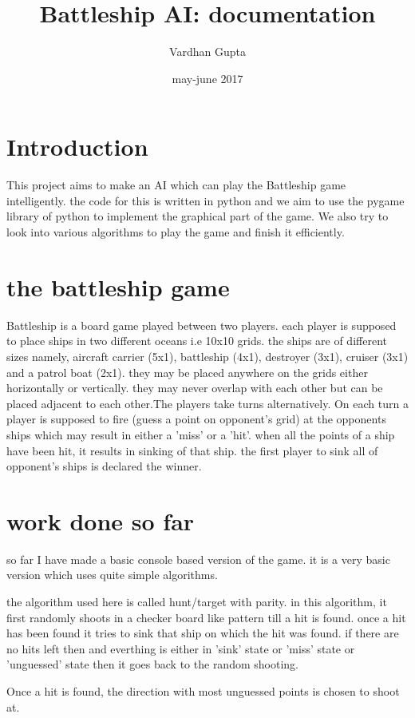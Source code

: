 \documentclass{article}
\title{Battleship AI: documentation}
\author{Vardhan Gupta}
\date{may-june 2017}
\begin{document}
   \maketitle
   \tableofcontents
   \section{Introduction}
   This project aims to make an AI which can play the Battleship game intelligently. the code for this is written in python and we aim to use the pygame library of python to implement the graphical part of the game. We also try to look into various algorithms to play the game and finish it efficiently.
   
   \section{the battleship game}
   Battleship is a board game played between two players. each player is supposed to place ships in two different oceans i.e 10x10 grids. the ships are of different sizes namely, aircraft carrier (5x1), battleship (4x1), destroyer (3x1), cruiser (3x1) and a patrol boat (2x1). they may be placed anywhere on the grids either horizontally or vertically. they may never overlap with each other but can be placed adjacent to each other.The players take turns alternatively. On each turn a player is supposed to fire (guess a point on opponent's grid) at the opponents ships which may result in either a 'miss' or a 'hit'. when all the points of a ship have been hit, it results in sinking of that ship. the first player to sink all of opponent's ships is declared the winner.
   
   \section{work done so far}
   so far I have made a basic console based version of the game. it is a very basic version which uses quite simple algorithms.
   
   the algorithm used here is called hunt/target with parity. in this algorithm, it first randomly shoots in a checker board like pattern till a hit is found. once a hit has been found it tries to sink that ship on which the hit was found. if there are no hits left then and everthing is either in 'sink' state or 'miss' state or 'unguessed' state then it goes back to the random shooting.
   
   Once a hit is found, the direction with most unguessed points is chosen to shoot at.
\end{document}
